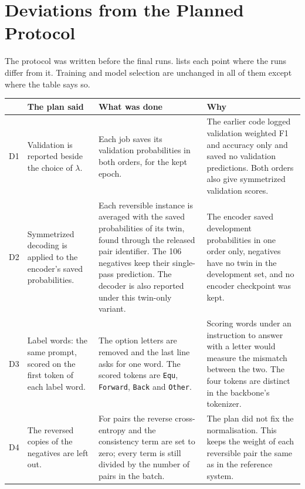 \appendix

\section{Deviations from the Planned Protocol}
\label{app:deviations}

The protocol was written before the final runs.  lists each point where the runs differ from it. Training and model selection are unchanged in all of them except where the table says so.

\begin{table}[t]
\centering
\small
\begin{tabular}{@{}N{0.03\textwidth}L{0.24\textwidth}L{0.31\textwidth}L{0.34\textwidth}@{}}
\toprule
 & The plan said & What was done & Why \\
\midrule
D1 & Validation \HardCons{} is reported beside the choice of $\lambda$. & Each job saves its validation probabilities in both orders, for the kept epoch. & The earlier code logged validation weighted F1 and accuracy only and saved no validation predictions. Both orders also give symmetrized validation scores. \\
\addlinespace
D2 & Symmetrized decoding is applied to the encoder's saved probabilities. & Each reversible instance is averaged with the saved probabilities of its twin, found through the released pair identifier. The 106 negatives keep their single-pass prediction. The decoder is also reported under this twin-only variant. & The encoder saved development probabilities in one order only, negatives have no twin in the development set, and no encoder checkpoint was kept. \\
\addlinespace
D3 & Label words: the same prompt, scored on the first token of each label word. & The option letters are removed and the last line asks for one word. The scored tokens are \texttt{Equ}, \texttt{Forward}, \texttt{Back} and \texttt{Other}. & Scoring words under an instruction to answer with a letter would measure the mismatch between the two. The four tokens are distinct in the backbone's tokenizer. \\
\addlinespace
D4 & The reversed copies of the negatives are left out. & For \NO{} pairs the reverse cross-entropy and the consistency term are set to zero; every term is still divided by the number of pairs in the batch. & The plan did not fix the normalisation. This keeps the weight of each reversible pair the same as in the reference system. \\

\end{tabular}
\end{table}
